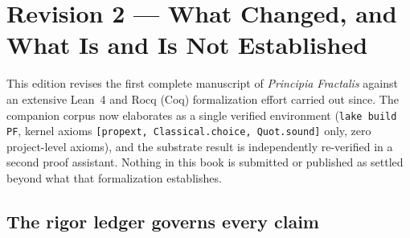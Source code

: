 %

\chapter*{Revision 2 --- What Changed, and What Is and Is Not Established}


This edition revises the first complete manuscript of \emph{Principia Fractalis}
against an extensive Lean~4 and Rocq (Coq) formalization effort carried out
since. The companion corpus now elaborates as a single verified environment
(\texttt{lake build PF}, kernel axioms \texttt{[propext, Classical.choice,
Quot.sound]} only, zero project-level axioms), and the substrate result is
independently re-verified in a second proof assistant. Nothing in this book is
submitted or published as settled beyond what that formalization establishes.

\section*{The rigor ledger governs every claim}

